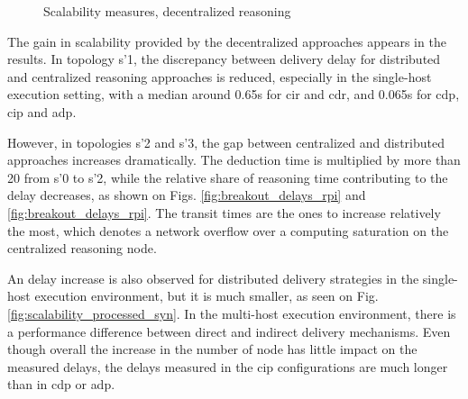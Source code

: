 \documentclass{iosart2c}
\begin{document}
\begin{figure}
	\caption{Scalability measures, decentralized reasoning}
	\vfill
	\noindent
	
	\begin{minipage}{0.33\textwidth}
		\Centering
		\label{fig:scalability_processed_rpi}
		\scalebox{0.9}{
			
		}
	\end{minipage}
	\begin{minipage}{0.33\textwidth}
		\Centering
		\scalebox{0.9}{
			
		}
	\end{minipage}
	\begin{minipage}{0.329\textwidth}
		\Centering
		\label{fig:factory_scala_cip_rpi2}
		\scalebox{0.9}{
			
		}
	\end{minipage}
\end{figure}

The gain in scalability provided by the decentralized approaches appears in the results. 
In topology s'1, the discrepancy between delivery delay for distributed and centralized reasoning approaches is reduced, especially in the single-host execution setting, with a median around 0.65s for \gls{cir} and \gls{cdr}, and 0.065s for \gls{cdp}, \gls{cip} and \gls{adp}.

However, in topologies s'2 and s'3, the gap between centralized and distributed approaches increases dramatically. 
The deduction time is multiplied by more than 20 from s'0 to s'2, while the relative share of reasoning time contributing to the delay decreases, as shown on Figs. \ref{fig:breakout_delays_rpi} and \ref{fig:breakout_delays_rpi}.
The transit times are the ones to increase relatively the most, which denotes a network overflow over a computing saturation on the centralized reasoning node.

An delay increase is also observed for distributed delivery strategies in the single-host execution environment, but it is much smaller, as seen on Fig. \ref{fig:scalability_processed_syn}.
In the multi-host execution environment, there is a performance difference between direct and indirect delivery mechanisms.
Even though overall the increase in the number of node has little impact on the measured delays, the delays measured in the \gls{cip} configurations are much longer than in \gls{cdp} or \gls{adp}. 
\end{document}
